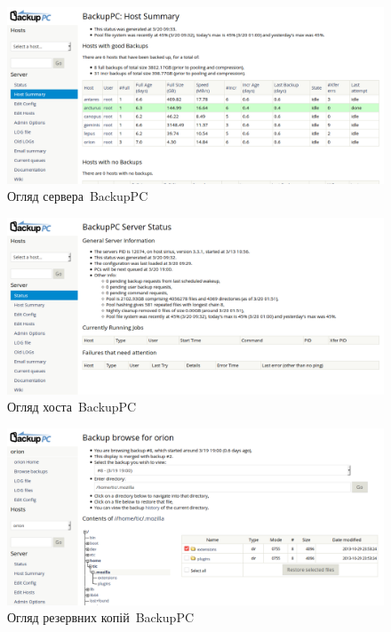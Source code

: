 \documentclass[
	a4paper,
	oneside,
	BCOR = 10mm,
	DIV = 12,
	12pt,
	headings = normal,
]{scrartcl}
\begin{document}
			\begin{figure}[!htbp]
				\centering
				\includegraphics[height=9\baselineskip]{./assets/y04s01-infosec-lab-01-03-p20.png}
				\caption{Огляд сервера~\textenglish{BackupPC}}
				\label{fig:04-backuppc-01-01}
			\end{figure}

			\begin{figure}[!htbp]
				\centering
				\includegraphics[height=9\baselineskip]{./assets/y04s01-infosec-lab-01-03-p21.png}
				\caption{Огляд хоста~\textenglish{BackupPC}}
				\label{fig:04-backuppc-01-02}
			\end{figure}

			\begin{figure}[!htbp]
				\centering
				\includegraphics[height=9\baselineskip]{./assets/y04s01-infosec-lab-01-03-p22.png}
				\caption{Огляд резервних копій~\textenglish{BackupPC}}
				\label{fig:04-backuppc-01-03}
			\end{figure}
\end{document}
